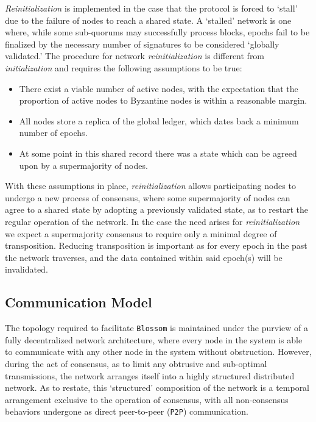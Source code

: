 \textit{Reinitialization} is implemented in the case that the protocol is forced to ‘stall’ due to the failure of nodes to reach a shared state. A ‘stalled’ network is one where, while some sub-quorums may successfully process blocks, epochs fail to be finalized by the necessary number of signatures to be considered ‘globally validated.’ The procedure for network \textit{reinitialization} is different from \textit{initialization} and requires the following assumptions to be true: 
\begin{itemize}
    \item There exist a viable number of active nodes, with the expectation that the proportion of active nodes to Byzantine nodes is within a reasonable margin.
    \item All nodes store a replica of the global ledger, which dates back a minimum number of epochs.
    \item At some point in this shared record there was a state which can be agreed upon by a supermajority of nodes.
\end{itemize}

With these assumptions in place, \textit{reinitialization} allows participating nodes to undergo a new process of consensus, where some supermajority of nodes can agree to a shared state by  adopting a previously validated state, as to restart the regular operation of the network. In the case the need arises for \textit{reinitialization} we expect a supermajority consensus to require only a minimal degree of transposition. Reducing transposition is important as for every epoch in the past the network traverses, and the data contained within said epoch(s) will be invalidated.


\subsection{Communication Model}\label{struc:comm_model}
The topology required to facilitate \texttt{Blossom} is maintained under the purview of a fully decentralized network architecture, where every node in the system is able to communicate with any other node in the system without obstruction. However, during the act of consensus, as to limit any obtrusive and sub-optimal transmissions, the network arranges itself into a highly structured distributed network. As to restate, this ‘structured’ composition of the network is a temporal arrangement exclusive to the operation of consensus, with all non-consensus behaviors undergone as direct peer-to-peer (\texttt{P2P}) communication.

